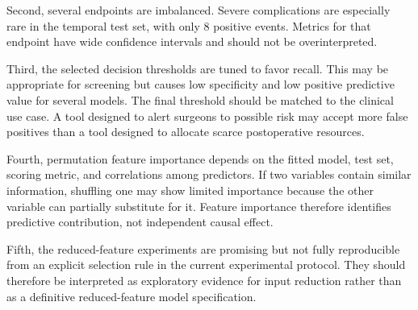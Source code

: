 \documentclass[11pt,a4paper]{article}
\begin{document}
Second, several endpoints are imbalanced. Severe complications are especially rare in the temporal test set, with only 8 positive events. Metrics for that endpoint have wide confidence intervals and should not be overinterpreted.

Third, the selected decision thresholds are tuned to favor recall. This may be appropriate for screening but causes low specificity and low positive predictive value for several models. The final threshold should be matched to the clinical use case. A tool designed to alert surgeons to possible risk may accept more false positives than a tool designed to allocate scarce postoperative resources.

Fourth, permutation feature importance depends on the fitted model, test set, scoring metric, and correlations among predictors. If two variables contain similar information, shuffling one may show limited importance because the other variable can partially substitute for it. Feature importance therefore identifies predictive contribution, not independent causal effect.

Fifth, the reduced-feature experiments are promising but not fully reproducible from an explicit selection rule in the current experimental protocol. They should therefore be interpreted as exploratory evidence for input reduction rather than as a definitive reduced-feature model specification.



\end{document}
